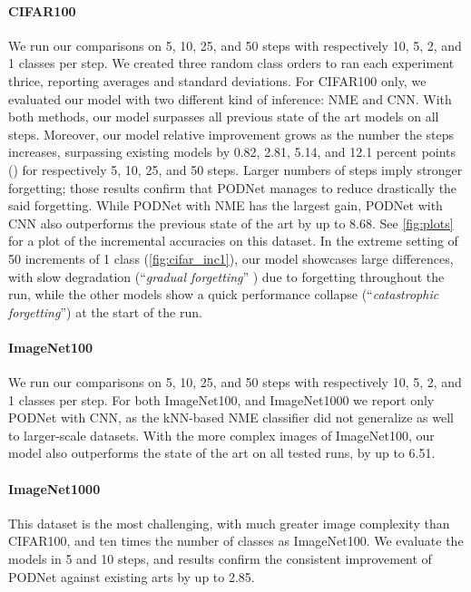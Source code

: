 \paragraph{CIFAR100} We run our comparisons on 5, 10, 25, and 50 steps with respectively 10, 5, 2,
and 1 classes per step. We created three random class orders to ran each experiment thrice,
reporting averages and standard deviations. For CIFAR100 only, we evaluated our model with two
different kind of inference: NME and CNN. With both methods, our model surpasses all previous state
of the art models on all steps. Moreover, our model relative improvement grows as the number the
steps increases, surpassing existing models by 0.82, 2.81, 5.14, and 12.1 percent points (\pp) for
respectively 5, 10, 25, and 50 steps. Larger numbers of steps imply  stronger forgetting; those
results confirm that PODNet manages to reduce drastically the said forgetting. While PODNet with NME
has the largest gain, PODNet with CNN also outperforms the previous state of the art by up to
8.68\pp. See \autoref{fig:plots} for a plot of the incremental accuracies on this dataset. In the
extreme setting of 50 increments of 1 class (\autoref{fig:cifar_inc1}), our model showcases large
differences, with slow degradation (``\textit{gradual forgetting}''
\citep{french1999catastrophicforgetting}) due to forgetting throughout the run, while the other
models show a quick performance collapse (``\textit{catastrophic forgetting}'') at the start of the
run.

\paragraph{ImageNet100} We run our comparisons on 5, 10, 25, and 50 steps with respectively 10, 5,
2, and 1 classes per step. For both ImageNet100, and ImageNet1000 we report only PODNet with CNN, as
the kNN-based NME classifier did not generalize as well to larger-scale datasets. With the more
complex images of ImageNet100, our model also outperforms the state of the art on all tested runs,
by up to 6.51\pp.

\paragraph{ImageNet1000} This dataset is the most challenging, with much greater image complexity
than CIFAR100, and ten times the number of classes as ImageNet100. We evaluate the models in 5 and
10 steps, and results confirm the consistent improvement of PODNet against existing arts by up to
2.85\pp.

